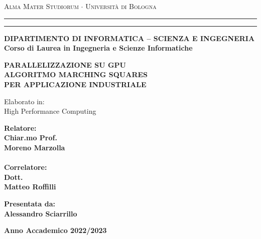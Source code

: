 \documentclass[12pt,a4paper]{report}
\begin{document}
\begin{titlepage}
\begin{center}
{{\Large{\textsc{Alma Mater Studiorum $\cdot$ Universit\`a di
Bologna}}}} \rule[0.1cm]{15.8cm}{0.1mm}
\rule[0.5cm]{15.8cm}{0.6mm}
{\small{\bf DIPARTIMENTO DI INFORMATICA – SCIENZA E INGEGNERIA\\
Corso di Laurea in Ingegneria e Scienze Informatiche }}
\end{center}
\vspace{15mm}
\begin{center}
{\LARGE{\bf PARALLELIZZAZIONE SU GPU}}\\
\vspace{3mm}
{\LARGE{\bf ALGORITMO MARCHING SQUARES}}\\
\vspace{3mm}
{\LARGE{\bf PER APPLICAZIONE INDUSTRIALE}}\\
\vspace{25mm}

Elaborato in:\\
High Performance Computing\\
\end{center}
\vspace{25mm}
\par
\noindent
\begin{minipage}[t]{0.47\textwidth}
{\large{\bf Relatore:\\
Chiar.mo Prof.\\
Moreno Marzolla\\}}
{\large{\bf \\Correlatore:\\
Dott.\\
Matteo Roffilli}}
\end{minipage}
\hfill
\begin{minipage}[t]{0.47\textwidth}\raggedleft
{\large{\bf Presentata da:\\
Alessandro Sciarrillo}}
\end{minipage}
\vspace{30mm}
\begin{center}
{\large{\bf 
Anno Accademico 2022/2023}}%
\end{center}
\end{titlepage}

\tableofcontents
\end{document}
